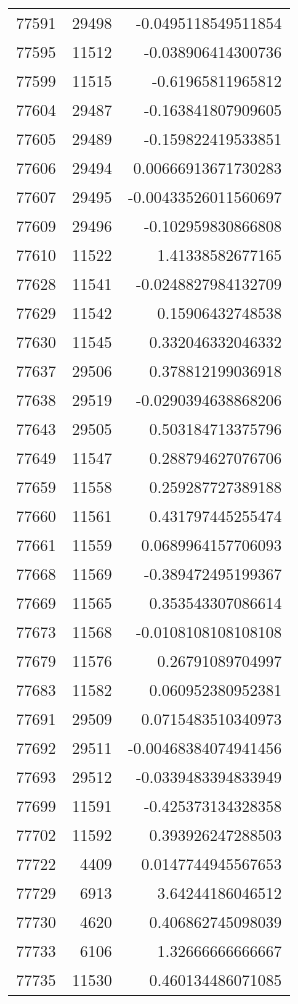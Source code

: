 \begin{tabular}{r | r | r}
77591 & 29498 & -0.0495118549511854 \\
77595 & 11512 & -0.038906414300736 \\
77599 & 11515 & -0.61965811965812 \\
77604 & 29487 & -0.163841807909605 \\
77605 & 29489 & -0.159822419533851 \\
77606 & 29494 & 0.00666913671730283 \\
77607 & 29495 & -0.00433526011560697 \\
77609 & 29496 & -0.102959830866808 \\
77610 & 11522 & 1.41338582677165 \\
77628 & 11541 & -0.0248827984132709 \\
77629 & 11542 & 0.15906432748538 \\
77630 & 11545 & 0.332046332046332 \\
77637 & 29506 & 0.378812199036918 \\
77638 & 29519 & -0.0290394638868206 \\
77643 & 29505 & 0.503184713375796 \\
77649 & 11547 & 0.288794627076706 \\
77659 & 11558 & 0.259287727389188 \\
77660 & 11561 & 0.431797445255474 \\
77661 & 11559 & 0.0689964157706093 \\
77668 & 11569 & -0.389472495199367 \\
77669 & 11565 & 0.353543307086614 \\
77673 & 11568 & -0.0108108108108108 \\
77679 & 11576 & 0.26791089704997 \\
77683 & 11582 & 0.060952380952381 \\
77691 & 29509 & 0.0715483510340973 \\
77692 & 29511 & -0.00468384074941456 \\
77693 & 29512 & -0.0339483394833949 \\
77699 & 11591 & -0.425373134328358 \\
77702 & 11592 & 0.393926247288503 \\
77722 & 4409 & 0.0147744945567653 \\
77729 & 6913 & 3.64244186046512 \\
77730 & 4620 & 0.406862745098039 \\
77733 & 6106 & 1.32666666666667 \\
77735 & 11530 & 0.460134486071085 \\

\end{tabular}

